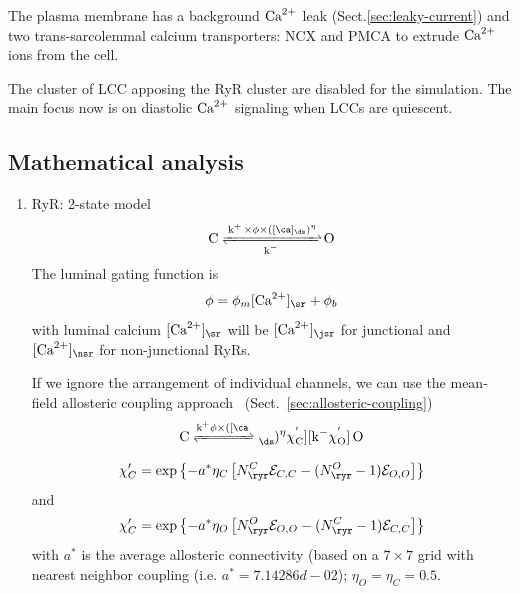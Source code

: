 The plasma membrane has a background ${\text{Ca}^{2+}}$ leak
(Sect.\ref{sec:leaky-current}) and two trans-sarcolemmal calcium transporters:
NCX and PMCA to extrude ${\text{Ca}^{2+}}$ ions from the cell. 

\begin{framed}
  The cluster of LCC apposing the RyR cluster are disabled for the
  simulation. The main focus now is on diastolic ${\text{Ca}^{2+}}$ signaling when
  LCCs are quiescent. 
\end{framed}


\subsection{Mathematical analysis}
\label{sec:math-analys-1}

\begin{enumerate}
\item RyR: 2-state model
  \begin{equation}
    \label{eq:1122}
    \ce{C <=>[\ce{k^+ \times \phi \times ([\ca]_\ds)^{\eta}}][k^-] O}
  \end{equation}
  The luminal gating function is
  \begin{equation}
    \label{eq:1121}
    \phi = \phi_m[\Ca]_\sr + \phi_b
  \end{equation}
  with luminal calcium $[\Ca]_\sr$ will be $[\Ca]_\jsr$ for junctional
  and $[\Ca]_\nsr$ for non-junctional RyRs. 

  If we ignore the arrangement of individual channels, we can use the
  mean-field allosteric coupling approach~\citep{groff2008}
  (Sect.~\ref{sec:allosteric-coupling}) 
  \begin{equation}
    \label{eq:1212}
    \ce{C <=>[k^+\phi\times([\ca]_{\ds})^\eta\chi^'_C][k^-\chi^'_O] O}
  \end{equation}

  \begin{equation}
    \label{eq:1126}
    \chi'_C = \exp\left\{-a^*\eta_C\left[N^C_\ryr \mathcal{E}_{C,C} - (N^O_\ryr-1)\mathcal{E}_{O,O}\right]\right\}
  \end{equation}
  and
  \begin{equation}
    \label{eq:1127}
    \chi'_C = \exp\left\{-a^*\eta_O\left[N^O_\ryr \mathcal{E}_{O,O} - (N^C_\ryr-1)\mathcal{E}_{C,C}\right]\right\}  
  \end{equation}
  with $a^*$ is the average allosteric connectivity (based on a
  $7\times 7$ grid with nearest neighbor coupling
  (i.e. $a^*=7.14286d-02$); $\eta_O=\eta_C=0.5$.


\end{enumerate}
